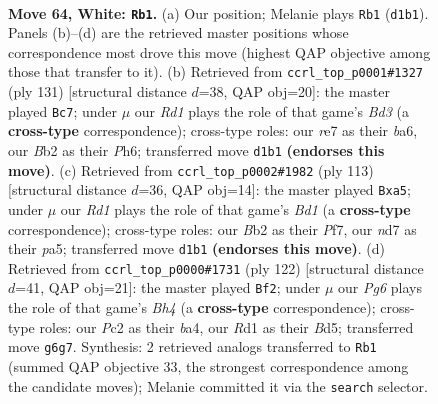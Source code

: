 \documentclass[11pt]{article}
\begin{document}
\clearpage

\begin{figure}[p]\centering
\begin{subfigure}{0.46\textwidth}\centering
\resizebox{\linewidth}{!}{%
\newchessgame
\chessboard[
  setfen={6k1/3nr3/6P1/8/p1p5/P1P4p/1BP4P/3R3K w - - 17 64},
  showmover=false,
  pgfstyle=straightmove, color=movearrow, markmove={d1-b1}
]}
\caption{}
\end{subfigure}\hfill
\begin{subfigure}{0.46\textwidth}\centering
\resizebox{\linewidth}{!}{%
\newchessgame
\chessboard[
  setfen={8/p4p2/B2b1k1p/2p2p2/P4P2/2P1K2P/1P6/8 b - - 38 66},
  showmover=false,
  pgfstyle=straightmove, color=movearrow, markmove={d6-c7}
]}
\caption{}
\end{subfigure}
\\[4pt]
\begin{subfigure}{0.46\textwidth}\centering
\resizebox{\linewidth}{!}{%
\newchessgame
\chessboard[
  setfen={3b4/kp3p2/3p4/PB1P1p2/1p5p/1P1K1P1P/8/8 b - - 2 57},
  showmover=false,
  pgfstyle=straightmove, color=movearrow, markmove={d8-a5}
]}
\caption{}
\end{subfigure}\hfill
\begin{subfigure}{0.46\textwidth}\centering
\resizebox{\linewidth}{!}{%
\newchessgame
\chessboard[
  setfen={8/n3kp2/1p4p1/3Bp1P1/bP5B/3P1K2/4P3/8 w - - 7 62},
  showmover=false,
  pgfstyle=straightmove, color=movearrow, markmove={h4-f2}
]}
\caption{}
\end{subfigure}
\caption{\textbf{Move 64, White: \texttt{Rb1}.} (a) Our position; Melanie plays \texttt{Rb1} (\texttt{d1b1}). Panels (b)--(d) are the retrieved master positions whose correspondence most drove this move (highest QAP objective among those that transfer to it). (b) Retrieved from \texttt{ccrl\_top\_p0001\#1327} (ply 131) [structural distance $d$=38, QAP obj=20]: the master played \texttt{Bc7}; under $\mu$ our \emph{Rd1} plays the role of that game's \emph{Bd3} (a \textbf{cross-type} correspondence); cross-type roles: our \emph{r}e7 as their \emph{b}a6, our \emph{B}b2 as their \emph{P}h6; transferred move \texttt{d1b1} \textbf{(endorses this move)}. (c) Retrieved from \texttt{ccrl\_top\_p0002\#1982} (ply 113) [structural distance $d$=36, QAP obj=14]: the master played \texttt{Bxa5}; under $\mu$ our \emph{Rd1} plays the role of that game's \emph{Bd1} (a \textbf{cross-type} correspondence); cross-type roles: our \emph{B}b2 as their \emph{P}f7, our \emph{n}d7 as their \emph{p}a5; transferred move \texttt{d1b1} \textbf{(endorses this move)}. (d) Retrieved from \texttt{ccrl\_top\_p0000\#1731} (ply 122) [structural distance $d$=41, QAP obj=21]: the master played \texttt{Bf2}; under $\mu$ our \emph{Pg6} plays the role of that game's \emph{Bh4} (a \textbf{cross-type} correspondence); cross-type roles: our \emph{P}c2 as their \emph{b}a4, our \emph{R}d1 as their \emph{B}d5; transferred move \texttt{g6g7}. Synthesis: 2 retrieved analogs transferred to \texttt{Rb1} (summed QAP objective 33, the strongest correspondence among the candidate moves); Melanie committed it via the \texttt{search} selector.}
\label{fig:thought-m126}
\end{figure}
\end{document}
